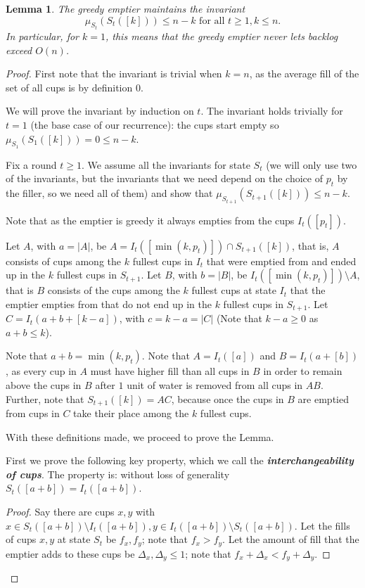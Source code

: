 \documentclass[twocolumn]{article}[10pt]
\newcommand{\defn}[1]{{\textit{\textbf{\boldmath #1}}}\xspace}
\newtheorem{lemma}{Lemma}
\begin{document}
\begin{lemma}
  The greedy emptier maintains the invariant $$\mu_{S_t}(S_t([k])) \le n-k
  \text{ for all } t\ge 1, k \le n.$$ In particular, for $k=1$, this
  means that the greedy emptier never lets backlog exceed $O(n)$.
\end{lemma}
\begin{proof}
First note that the invariant is trivial when $k=n$, as the average fill of the
set of all cups is by definition $0$.

We will prove the invariant by induction on $t$.
The invariant holds trivially for $t=1$ (the base case of our recurrence): 
the cups start empty so $\mu_{S_1}(S_1([k])) = 0 \le n-k$.

Fix a round $t \ge 1$. We assume all the invariants for state $S_t$ (we will
only use two of the invariants, but the invariants that we need depend on the
choice of $p_t$ by the filler, so we need all of them) and show that
$\mu_{S_{t+1}}(S_{t+1}([k])) \le n-k$. 

Note that as the emptier is greedy it always empties from the cups $I_t([p_t])$.

Let $A$, with $a=|A|$, be $A = I_t([\min(k, p_t)]) \cap S_{t+1}([k])$, that is, $A$
consists of cups among the $k$ fullest cups in $I_t$ that were emptied from and
ended up in the $k$ fullest cups in $S_{t+1}$.
Let $B$, with $b=|B|$, be $I_t([\min(k, p_t)]) \setminus A$, that is $B$ consists of
the cups among the $k$ fullest cups at state $I_t$ that the emptier empties
from that do not end up in the $k$ fullest cups in $S_{t+1}$. 
Let $C = I_t(a+b+[k-a])$, with $c=k-a = |C|$ (Note that $k-a\ge 0$ as $a+b \le k$). 

Note that $a+ b = \min(k, p_t)$.
Note that $A = I_t([a])$ and $B = I_t(a+[b])$, as every cup in $A$
must have higher fill than all cups in $B$ in order to remain above the cups in
$B$ after $1$ unit of water is removed from all cups in $AB$.
Further, note that $S_{t+1}([k]) = AC$, because once the cups in $B$
are emptied from cups in $C$ take their place among the $k$ fullest cups.

With these definitions made, we proceed to prove the Lemma.

First we prove the following key property, which we call the \defn{interchangeability of cups}.
The property is: without loss of generality $S_t([a+b]) = I_t([a+b])$.
\begin{proof}
  Say there are cups $x, y$ with $x\in S_t([a+b]) \setminus I_t([a+b]), y \in
  I_t([a+b])\setminus S_t([a+b])$. Let the fills of cups $x,y$ at state $S_t$
  be $f_x, f_y$; note that $f_x > f_y$. Let the amount of fill that the emptier
  adds to these cups be $\Delta_x, \Delta_y \le 1$; note that $f_x +\Delta_x <
  f_y + \Delta_y$.


\end{proof}
\end{proof}
\end{document}
